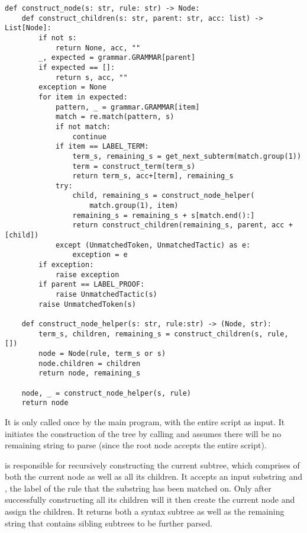\begin{verbatim}
def construct_node(s: str, rule: str) -> Node:
    def construct_children(s: str, parent: str, acc: list) -> List[Node]:
        if not s:
            return None, acc, ""
        _, expected = grammar.GRAMMAR[parent]
        if expected == []:
            return s, acc, ""
        exception = None
        for item in expected:
            pattern, _ = grammar.GRAMMAR[item]
            match = re.match(pattern, s)
            if not match:
                continue
            if item == LABEL_TERM:
                term_s, remaining_s = get_next_subterm(match.group(1))
                term = construct_term(term_s)
                return term_s, acc+[term], remaining_s
            try:
                child, remaining_s = construct_node_helper(
                    match.group(1), item)
                remaining_s = remaining_s + s[match.end():]
                return construct_children(remaining_s, parent, acc + [child])
            except (UnmatchedToken, UnmatchedTactic) as e:
                exception = e
        if exception:
            raise exception
        if parent == LABEL_PROOF:
            raise UnmatchedTactic(s)
        raise UnmatchedToken(s)

    def construct_node_helper(s: str, rule:str) -> (Node, str):
        term_s, children, remaining_s = construct_children(s, rule, [])
        node = Node(rule, term_s or s)
        node.children = children
        return node, remaining_s

    node, _ = construct_node_helper(s, rule)
    return node
\end{verbatim}

It is only called once by the main program, with the entire script as input. It initiates the construction of the tree by calling  and assumes there will be no remaining string to parse (since the root node  accepts the entire script).

 is responsible for recursively constructing the current subtree, which comprises of both the current node as well as all its children. It accepts an input substring  and , the label of the rule that the substring has been matched on. Only after successfully constructing all its children will it then create the current node and assign the children. It returns both a syntax subtree as well as the remaining string that contains sibling subtrees to be further parsed.

